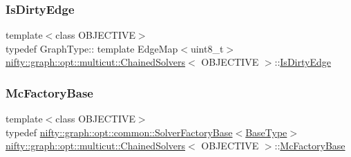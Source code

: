 \mbox{\label{classnifty_1_1graph_1_1opt_1_1multicut_1_1ChainedSolvers_a23dbba4746efaf4919d2d40bb2baaea2}} 
\subsubsection{\texorpdfstring{Is\+Dirty\+Edge}{IsDirtyEdge}}
{\footnotesize\ttfamily template$<$class O\+B\+J\+E\+C\+T\+I\+VE$>$ \\
typedef Graph\+Type\+:: template Edge\+Map$<$uint8\+\_\+t$>$ \hyperlink{classnifty_1_1graph_1_1opt_1_1multicut_1_1ChainedSolvers}{nifty\+::graph\+::opt\+::multicut\+::\+Chained\+Solvers}$<$ O\+B\+J\+E\+C\+T\+I\+VE $>$\+::\hyperlink{classnifty_1_1graph_1_1opt_1_1multicut_1_1ChainedSolvers_a23dbba4746efaf4919d2d40bb2baaea2}{Is\+Dirty\+Edge}}

\mbox{\label{classnifty_1_1graph_1_1opt_1_1multicut_1_1ChainedSolvers_acb272f072d6f09a3a6f136fe2ee31068}} 
\subsubsection{\texorpdfstring{Mc\+Factory\+Base}{McFactoryBase}}
{\footnotesize\ttfamily template$<$class O\+B\+J\+E\+C\+T\+I\+VE$>$ \\
typedef \hyperlink{classnifty_1_1graph_1_1opt_1_1common_1_1SolverFactoryBase}{nifty\+::graph\+::opt\+::common\+::\+Solver\+Factory\+Base}$<$\hyperlink{classnifty_1_1graph_1_1opt_1_1multicut_1_1ChainedSolvers_a77e11f6353ef773b9570eb302158bc12}{Base\+Type}$>$ \hyperlink{classnifty_1_1graph_1_1opt_1_1multicut_1_1ChainedSolvers}{nifty\+::graph\+::opt\+::multicut\+::\+Chained\+Solvers}$<$ O\+B\+J\+E\+C\+T\+I\+VE $>$\+::\hyperlink{classnifty_1_1graph_1_1opt_1_1multicut_1_1ChainedSolvers_acb272f072d6f09a3a6f136fe2ee31068}{Mc\+Factory\+Base}}

